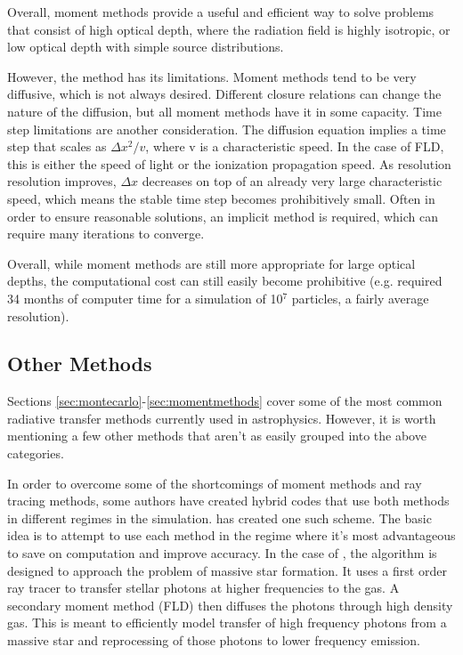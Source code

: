 Overall, moment methods provide a useful and efficient way to solve problems that consist of high optical depth, where the radiation field is highly isotropic, or low optical depth with simple source distributions.

However, the method has its limitations. Moment methods tend to be very diffusive, which is not always desired. Different closure relations can change the nature of the diffusion, but all moment methods have it in some capacity. Time step limitations are another consideration. The diffusion equation implies a time step that scales as $\Delta x^2/v$, where v is a characteristic speed. In the case of FLD, this is either the speed of light or the ionization propagation speed. As resolution resolution improves, $\Delta x$ decreases on top of an already very large characteristic speed, which means the stable time step becomes prohibitively small. Often in order to ensure reasonable solutions, an implicit method is required, which can require many iterations to converge.

Overall, while moment methods are still more appropriate for large optical depths, the computational cost can still easily become prohibitive (e.g. \citet{bate12} required 34 months of computer time for a simulation of 10$^7$ particles, a fairly average resolution).

\subsection{Other Methods}
\label{sec:othermethods}

Sections \ref{sec:montecarlo}-\ref{sec:momentmethods} cover some of the most common radiative transfer methods currently used in astrophysics. However, it is worth mentioning a few other methods that aren't as easily grouped into the above categories.

In order to overcome some of the shortcomings of moment methods and ray tracing methods, some authors have created hybrid codes that use both methods in different regimes in the simulation. \citet{kuiperEt10} has created one such scheme. The basic idea is to attempt to use each method in the regime where it's most advantageous to save on computation and improve accuracy. In the case of \citet{kuiperEt10}, the algorithm is designed to approach the problem of massive star formation. It uses a first order ray tracer to transfer stellar photons at higher frequencies to the gas. A secondary moment method (FLD) then diffuses the photons through high density gas. This is meant to efficiently model transfer of high frequency photons from a massive star and reprocessing of those photons to lower frequency emission.

